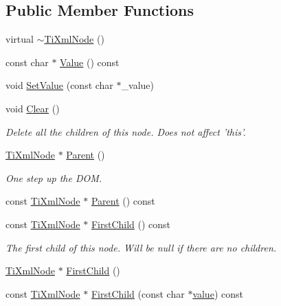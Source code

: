 \subsection*{Public Member Functions}
\begin{DoxyCompactItemize}
\item 
virtual \hyperlink{class_ti_xml_node_a027a76cccd359c831ee4024b58c49625}{$\sim$TiXmlNode} ()
\item 
const char $\ast$ \hyperlink{class_ti_xml_node_a77943eb90d12c2892b1337a9f5918b41}{Value} () const 
\item 
void \hyperlink{class_ti_xml_node_a2a38329ca5d3f28f98ce932b8299ae90}{SetValue} (const char $\ast$\_\-value)
\item 
void \hyperlink{class_ti_xml_node_a708e7f953df61d4d2d12f73171550a4b}{Clear} ()
\begin{DoxyCompactList}\small\item\em Delete all the children of this node. Does not affect 'this'. \item\end{DoxyCompactList}\item 
\hyperlink{class_ti_xml_node}{TiXmlNode} $\ast$ \hyperlink{class_ti_xml_node_ab643043132ffd794f8602685d34a982e}{Parent} ()
\begin{DoxyCompactList}\small\item\em One step up the DOM. \item\end{DoxyCompactList}\item 
const \hyperlink{class_ti_xml_node}{TiXmlNode} $\ast$ \hyperlink{class_ti_xml_node_a78878709e53066f06eb4fcbcdd3a5260}{Parent} () const 
\item 
const \hyperlink{class_ti_xml_node}{TiXmlNode} $\ast$ \hyperlink{class_ti_xml_node_a44c8eee26bbe2d1b2762038df9dde2f0}{FirstChild} () const 
\begin{DoxyCompactList}\small\item\em The first child of this node. Will be null if there are no children. \item\end{DoxyCompactList}\item 
\hyperlink{class_ti_xml_node}{TiXmlNode} $\ast$ \hyperlink{class_ti_xml_node_a5e97d69b7c0ebd27fb7286be56559b77}{FirstChild} ()
\item 
const \hyperlink{class_ti_xml_node}{TiXmlNode} $\ast$ \hyperlink{class_ti_xml_node_ab5f722624113c8203227de4f56576d31}{FirstChild} (const char $\ast$\hyperlink{class_ti_xml_node_aead528b3cedc33c16a6c539872c7cc8b}{value}) const 

\end{DoxyCompactItemize}
